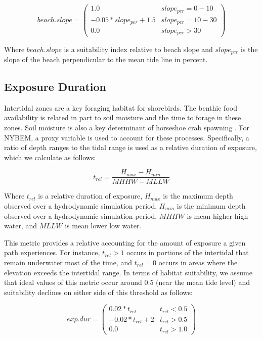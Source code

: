 \documentclass[
]{book}
\begin{document}
\[beach.slope = \begin{pmatrix} 1.0 & slope_{per}=0-10\\
-0.05*slope_{per}+1.5 & slope_{per}=10-30\\
0.0 & slope_{per}>30
\end{pmatrix}\]

Where \(beach.slope\) is a suitability index relative to beach slope and \(slope_{per}\) is the slope of the beach perpendicular to the mean tide line in percent.

\hypertarget{exposure-duration}{%
\subsection{Exposure Duration}\label{exposure-duration}}

Intertidal zones are a key foraging habitat for shorebirds. The benthic food availability is related in part to soil moisture \citep{brady_habitat_1996} and the time to forage in these zones. Soil moisture is also a key determinant of horseshoe crab spawning \citep{avissar_modeling_2006}. For NYBEM, a proxy variable is used to account for these processes. Specifically, a ratio of depth ranges to the tidal range is used as a relative duration of exposure, which we calculate as follows:

\[t_{rel} = \frac{H_{max} - H_{min}}{MHHW-MLLW}\]

Where \(t_{rel}\) is a relative duration of exposure, \(H_{max}\) is the maximum depth observed over a hydrodynamic simulation period, \(H_{min}\) is the minimum depth observed over a hydrodynamic simulation period, \(MHHW\) is mean higher high water, and \(MLLW\) is mean lower low water.

This metric provides a relative accounting for the amount of exposure a given path experiences. For instance, \(t_{rel}>1\) occurs in portions of the intertidal that remain underwater most of the time, and \(t_{rel}=0\) occurs in areas where the elevation exceeds the intertidal range. In terms of habitat suitability, we assume that ideal values of this metric occur around 0.5 (near the mean tide level) and suitability declines on either side of this threshold as follows:

\[exp.dur = \begin{pmatrix} 0.02*t_{rel} & t_{rel}<0.5\\
-0.02*t_{rel}+2 & t_{rel}>0.5\\
0.0 & t_{rel}>1.0
\end{pmatrix}\]
\end{document}
